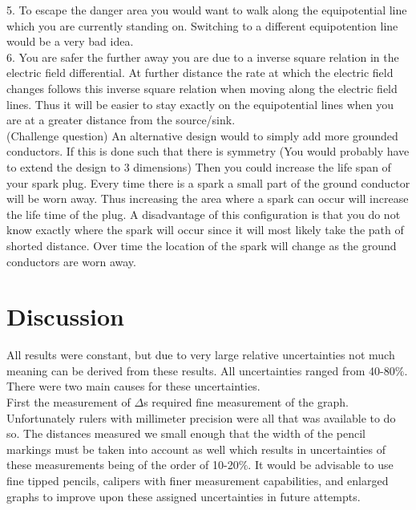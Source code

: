 \documentclass{article}
\begin{document}
5. To escape the danger area you would want to walk along the equipotential line which you are currently standing on. Switching to a different equipotention line would be a very bad idea.\\
6. You are safer the further away you are due to a inverse square relation in the electric field differential. At further distance the rate at which the electric field changes follows this inverse square relation when moving along the electric field lines. Thus it will be easier to stay exactly on the equipotential lines when you are at a greater distance from the source/sink. \\

(Challenge question) An alternative design would to simply add more grounded conductors. If this is done such that there is symmetry (You would probably have to extend the design to 3 dimensions) Then you could increase the life span of your spark plug. Every time there is a spark a small part of the ground conductor will be worn away. Thus increasing the area where a spark can occur will increase the life time of the plug. A disadvantage of this configuration is that you do not know exactly where the spark will occur since it will most likely take the path of shorted distance. Over time the location of the spark will change as the ground conductors are worn away.







\section{Discussion}
All results were constant, but due to very large relative uncertainties not much meaning can be derived from these results. All uncertainties ranged from 40-80$\%$. There were two main causes for these uncertainties.\\

First the measurement of $\Delta$s required fine measurement of the graph. Unfortunately rulers with millimeter precision were all that was available to do so. The distances measured we small enough that the width of the pencil markings must be taken into account as well which results in uncertainties of these measurements being of the order of 10-20$\%$. It would be advisable to use fine tipped pencils, calipers with finer measurement capabilities, and enlarged graphs to improve upon these assigned uncertainties in future attempts.\\
\end{document}
